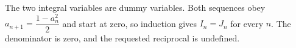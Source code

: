 The two integral variables are dummy variables. Both sequences obey $a_{n+1}=\dfrac{1-a_n^2}{2}$ and start at zero, so induction gives $I_n=J_n$ for every $n$. The denominator is zero, and the requested reciprocal is $\boxed{\text{undefined}}$.
